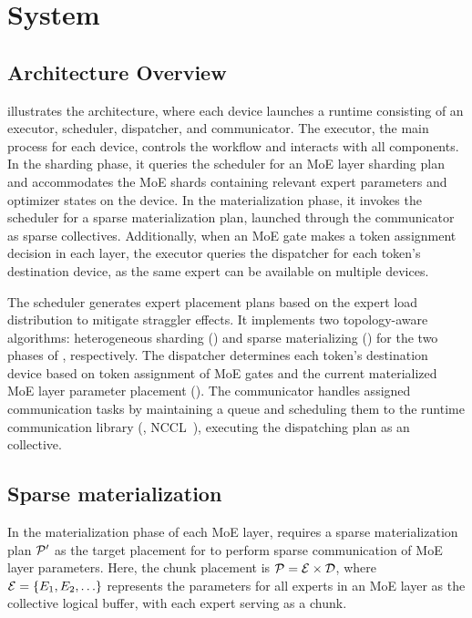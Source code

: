 

\section{\xxx System}\label{sec:arch}


\subsection{Architecture Overview}\label{sec:arch:overview}

 illustrates the \xxx architecture, where each device launches a runtime consisting of an executor, scheduler, dispatcher, and communicator.
The executor, the main process for each device, controls the \yyy workflow and interacts with all components.
In the sharding phase, it queries the scheduler for an MoE layer sharding plan and accommodates the MoE shards containing relevant expert parameters and optimizer states on the device.
In the materialization phase, it invokes the scheduler for a sparse materialization plan, launched through the communicator as sparse collectives.
Additionally, when an MoE gate makes a token assignment decision in each layer, the executor queries the dispatcher for each token's destination device, as the same expert can be available on multiple devices.

The scheduler generates expert placement plans based on the expert load distribution to mitigate straggler effects.
It implements two topology-aware algorithms: heterogeneous sharding () and sparse materializing () for the two phases of \yyy, respectively.
The dispatcher determines each token's destination device based on token assignment of MoE gates and the current materialized MoE layer parameter placement ().
The communicator handles assigned communication tasks by maintaining a queue and scheduling them to the runtime communication library (\eg, NCCL~\cite{nccl2020docs}), executing the dispatching plan as an \collatoa collective.






\subsection{Sparse materialization}\label{sec:arch:o2}

In the materialization phase of each MoE layer, \yyy requires a sparse materialization plan $\mathcal{P}'$ as the target placement for  to perform sparse communication of MoE layer parameters.
Here, the chunk placement is $\mathcal{P} = \mathcal{E} \times \mathcal{D}$, where $\mathcal{E} = \{E_1, E_2, \ldots\}$ represents the parameters for all experts in an MoE layer as the collective logical buffer, with each expert serving as a chunk.

